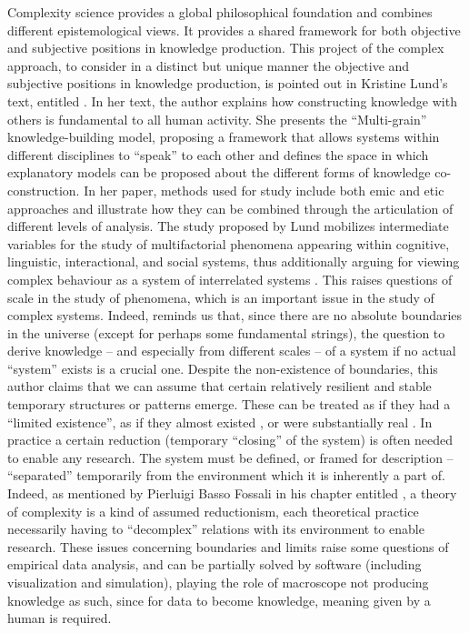 \documentclass[output=paper]{langscibook}
\begin{document}
Complexity science provides a global philosophical foundation and combines different epistemological views.  It provides a shared framework for both objective and subjective positions in knowledge production. This project of the complex approach, to consider in a distinct but unique manner the objective and subjective positions in knowledge production, is pointed out in Kristine Lund’s text, entitled . In her text, the author explains how constructing knowledge with others is fundamental to all human activity. She presents the “Multi-grain” knowledge-building model, proposing a framework that allows systems within different disciplines to “speak” to each other and defines the space in which explanatory models can be proposed about the different forms of knowledge co-construction. In her paper, methods used for study include both emic and etic approaches \citep{Headland1990,Pike1967} and illustrate how they can be combined through the articulation of different levels of analysis. The study proposed by Lund mobilizes intermediate variables for the study of multifactorial phenomena appearing within cognitive, linguistic, interactional, and social systems, thus additionally arguing for viewing complex behaviour as a system of interrelated systems \citep{Levinson2005}. This raises questions of scale in the study of phenomena, which is an important issue in the study of complex systems. Indeed, \citet{Partanen2015} reminds us that, since there are no absolute boundaries in the universe (except for perhaps some fundamental strings), the question to derive knowledge – and especially from different scales -- of a system if no actual “system” exists is a crucial one. Despite the non-existence of boundaries, this author claims that we can assume that certain relatively resilient and stable temporary structures or patterns emerge. These can be treated as if they had a “limited existence”, as if they almost existed \citep{Richardson2005}, or were substantially real \citep{Partanen2015}. In practice a certain reduction (temporary “closing” of the system) is often needed to enable any research. The system must be defined, or framed for description – “separated” temporarily from the environment which it is inherently a part of. Indeed, as mentioned by Pierluigi Basso Fossali in his chapter entitled , a theory of complexity is a kind of assumed reductionism, each theoretical practice necessarily having to “decomplex” relations with its environment to enable research. These issues concerning boundaries and limits raise some questions of empirical data analysis, and can be partially solved by software (including visualization and simulation), playing the role of macroscope not producing knowledge as such, since for data to become knowledge, meaning given by a human is required.
\end{document}
